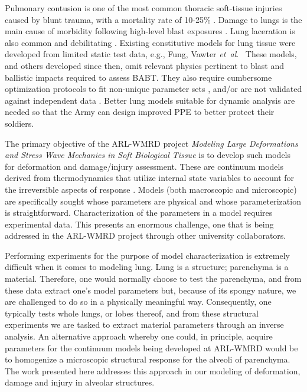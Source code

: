 Pulmonary contusion is one of the most common thoracic soft-tissue injuries caused by blunt trauma, with a mortality rate of 10-25\% \cite{Stitzeletal05}.  Damage to lungs is the main cause of morbidity following high-level blast exposures \cite{Stuhmilleretal88}.  Lung laceration is also common and debilitating \cite{VlessisTrunkey97}.  Existing constitutive models for lung tissue were developed from limited static test data, e.g., Fung, Vawter \textit{et~al}.\ \cite{Fungetal78,Vawteretal79,Vawter80} These models, and others developed since then, omit relevant physics pertinent to blast and ballistic impacts required to assess BABT.  They also require cumbersome optimization protocols to fit non-unique parameter sets \cite{Gayziketal07,Gayziketal11}, and\slash or are not validated against independent data \cite{Yuenetal08}.  Better lung models suitable for dynamic analysis are needed so that the Army can design improved PPE to better protect their soldiers.

The primary objective of the ARL-WMRD project \textit{Modeling Large Deformations and Stress Wave Mechanics in Soft Biological Tissue\/} is to develop such models for deformation and damage\slash injury assessment.  These are continuum models derived from thermo\-dynamics that utilize internal state variables to account for the irreversible aspects of response \cite{ClaytonFreed19,ClaytonFreed20}.  Models (both macro\-scopic and micro\-scopic) are specifically sought whose parameters are physical and whose parameterization is straightforward.  Characterization of the parameters in a model requires experimental data.  This presents an enormous challenge, one that is being addressed in the ARL-WMRD project through other university collaborators.  

Performing experiments for the purpose of model characterization is extremely difficult when it comes to modeling lung.  Lung is a structure; parenchyma is a material.  Therefore, one would normally choose to test the parenchyma, and from these data extract one's model parameters but, because of its spongy nature, we are challenged to do so in a physically meaningful way.  Consequently, one typically tests whole lungs, or lobes thereof, and from these structural experiments we are tasked to extract material parameters through an inverse analysis.  An alternative approach whereby one could, in principle, acquire parameters for the continuum models being developed at ARL-WMRD would be to homo\-genize a microscopic structural response for the alveoli of parenchyma.  The work presented here addresses this approach in our modeling of deformation, damage and injury in alveolar structures.


